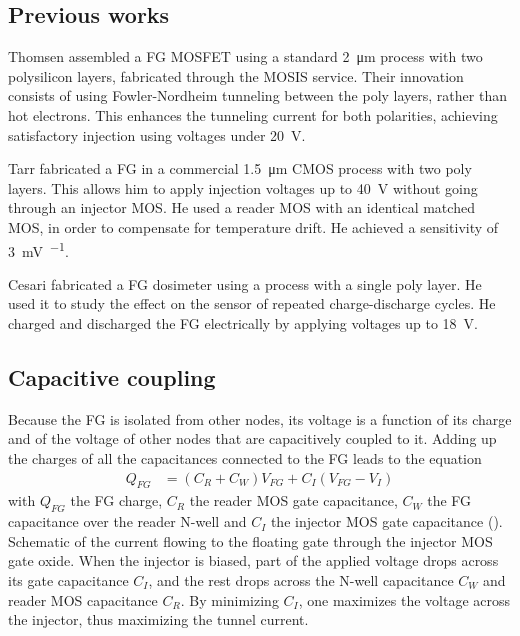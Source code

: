 \subsection{Previous works}
Thomsen\cite{thomsen_floating-gate_1991} assembled a FG MOSFET
using a standard \SI{2}{\micro\meter} process with two polysilicon layers,
fabricated through the MOSIS service\cite{noauthor_mosis_nodate}.
Their innovation consists of using Fowler-Nordheim tunneling between the poly layers,
rather than hot electrons.
This enhances the tunneling current for both polarities,
achieving satisfactory injection using voltages under \SI{20}{\volt}.

Tarr\cite{tarr_sensitive_2004} fabricated a FG in a commercial
\SI{1.5}{\micro\meter} CMOS process with two poly layers.
This allows him to apply injection voltages up to \SI{40}{\volt}
without going through an injector MOS.
He used a reader MOS with an identical matched MOS,
in order to compensate for temperature drift.
He achieved a sensitivity of \SI{3}{\milli\volt\per\rad}.

Cesari\cite{cesari_floating_2014} fabricated a FG dosimeter
using a process with a single poly layer.
He used it to study the effect on the sensor of repeated charge-discharge cycles.
He charged and discharged the FG electrically by applying voltages up to
\SI{18}{\volt}.

%
\subsection{Capacitive coupling}
Because the FG is isolated from other nodes,
its voltage is a function of its charge and of the voltage of other nodes that are capacitively coupled to it.
Adding up the charges of all the capacitances connected to the FG leads to the equation
\begin{align}
    Q_{FG} &= (C_R + C_W) V_{FG} + C_I (V_{FG}-V_I)
    \label{eq:ccoupling}
\end{align}
with $Q_{FG}$ the FG charge, $C_R$ the reader MOS gate capacitance,
$C_W$ the FG capacitance over the reader N-well and 
$C_I$ the injector MOS gate capacitance ().
{Schematic of the current flowing to the floating gate through the injector MOS gate oxide.
When the injector is biased, part of the applied voltage drops across its gate capacitance $C_I$,
and the rest drops across the N-well capacitance $C_W$ and reader MOS capacitance $C_R$.
By minimizing $C_I$, one maximizes the voltage across the injector,
thus maximizing the tunnel current.}
